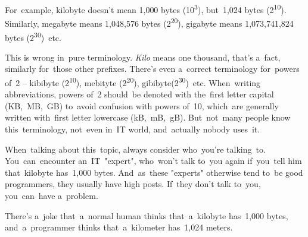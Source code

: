 For~example, kilobyte doesn't mean 1,000 bytes (10\textsuperscript{3}), but~1,024 bytes (2\textsuperscript{10}).
Similarly, megabyte means 1,048,576 bytes (2\textsuperscript{20}), gigabyte means 1,073,741,824 bytes (2\textsuperscript{30})~etc.

This is wrong in~pure terminology.
\textit{Kilo} means one thousand, that's a~fact, similarly for~those other prefixes.
There's even a~correct terminology for~powers of~2 -- kibibyte (2\textsuperscript{10}), mebityte (2\textsuperscript{20}), gibibyte(2\textsuperscript{30})~etc.
When~writing abbreviations, powers of~2 should~be denoted with the~first letter capital (KB,~MB,~GB) to~avoid confusion with powers of~10, which~are generally written with~first letter lowercase (kB,~mB,~gB).
But~not~many people know this~terminology, not~even in~IT world, and~actually nobody uses~it.

When~talking about this~topic, always consider who~you're talking~to.
You~can~encounter an~IT~"expert", who~won't talk to~you again if~you~tell him that~kilobyte has~1,000 bytes.
And~as~these "experts" otherwise tend to~be good programmers, they usually have high posts.
If~they don't talk to~you, you~can~have a~problem.

There's a~joke that~a~normal human thinks that~a~kilobyte has~1,000 bytes, and~a~programmer thinks that~a~kilometer has~1,024 meters.
